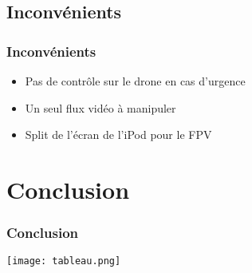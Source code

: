 \documentclass[11pt]{beamer}
\begin{document}
\subsection{Inconvénients}
\begin{frame}
\frametitle{Inconvénients}

\begin{itemize}
    \item Pas de contrôle sur le drone en cas d'urgence 
    
    \item Un seul flux vidéo à manipuler 
    
    \item Split de l'écran de l'iPod pour le FPV 
    
  \end{itemize}

\end{frame}

\section{Conclusion}
\begin{frame}
\frametitle{Conclusion}

\begin{center}
\texttt{[image: tableau.png]}
\end{center}

\end{frame}
\end{document}
